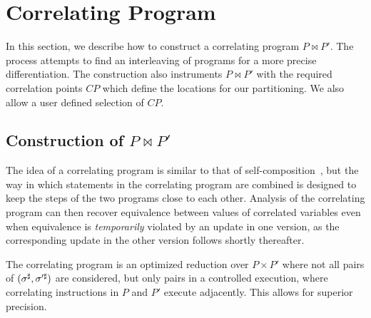\section{Correlating Program} 

In this section, we describe how to construct a correlating program $P \bowtie P'$. The process attempts to find an interleaving of programs for a more precise differentiation. The construction also instruments $P \bowtie P'$ with the required correlation points $CP$ which define the locations for our partitioning. We also allow a user defined selection of $CP$.

\subsection{Construction of $P \bowtie P'$ }
The idea of a correlating program is similar to that of
self-composition~\cite{AikenTerauchi05}, but the way in
which statements in the correlating program are combined is designed to
keep the steps of the two programs close to each other. Analysis of the correlating program can then recover equivalence between values of correlated variables even when
equivalence is \emph{temporarily} violated by an update in one version, as
the corresponding update in the other version follows shortly thereafter.

The correlating program is an optimized reduction over $P \times P'$ where not all pairs of $(\sigma^\sharp,\sigma'^\sharp)$ are considered, but only pairs in a controlled execution, where correlating instructions in $P$ and $P'$ execute adjacently. This allows for superior precision.

